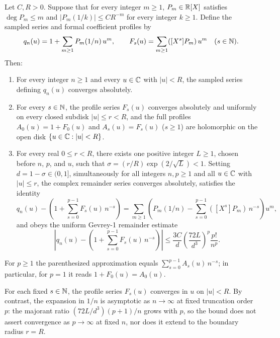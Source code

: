 \begin{theorem}
\label{thm:reciprocal-full-gevrey-expansion}
Let $C, R > 0$. Suppose that for every integer $m \ge 1$, $P_m \in \mathbb{R}[X]$ satisfies $\deg P_m \le m$ and $|P_m(1/k)| \le C R^{-m}$ for every integer $k \ge 1$. Define the sampled series and formal coefficient profiles by
\[
  q_n(u) = 1 + \sum_{m \ge 1} P_m(1/n)\, u^m,
  \qquad
  F_s(u) = \sum_{m \ge 1} ([X^s]P_m)\, u^m
  \quad (s \in \mathbb{N}).
\]
Then:
\begin{enumerate}
  \item For every integer $n \ge 1$ and every $u \in \mathbb{C}$ with $|u| < R$, the sampled series defining $q_n(u)$ converges absolutely.
  \item For every $s \in \mathbb{N}$, the profile series $F_s(u)$ converges absolutely and uniformly on every closed subdisk $|u| \le r < R$, and the full profiles $A_0(u) = 1 + F_0(u)$ and $A_s(u) = F_s(u)$ ($s \ge 1$) are holomorphic on the open disk $\{u \in \mathbb{C} : |u| < R\}$.
  \item For every real $0 \le r < R$, there exists one positive integer $L \ge 1$, chosen before $n$, $p$, and $u$, such that $\sigma = (r/R)\exp(2/\sqrt{L}) < 1$. Setting $d = 1 - \sigma \in (0, 1]$, simultaneously for all integers $n, p \ge 1$ and all $u \in \mathbb{C}$ with $|u| \le r$, the complex remainder series converges absolutely, satisfies the identity
  \[
    q_n(u) - \left(1 + \sum_{s=0}^{p-1} F_s(u)\,n^{-s}\right)
    = \sum_{m \ge 1} \left(P_m(1/n) - \sum_{s=0}^{p-1} ([X^s]P_m)\,n^{-s}\right) u^m,
  \]
  and obeys the uniform Gevrey-1 remainder estimate
  \[
    \left|q_n(u) - \left(1 + \sum_{s=0}^{p-1} F_s(u)\,n^{-s}\right)\right|
    \le \frac{3C}{d}\left(\frac{72L}{d^3}\right)^p \frac{p!}{n^p}.
  \]
\end{enumerate}
For $p \ge 1$ the parenthesized approximation equals $\sum_{s=0}^{p-1} A_s(u)\,n^{-s}$; in particular, for $p = 1$ it reads $1 + F_0(u) = A_0(u)$.
\leanok
{}
\end{theorem}

For each fixed $s \in \mathbb{N}$, the profile series $F_s(u)$ converges in $u$ on $|u| < R$. By contrast, the expansion in $1/n$ is asymptotic as $n \to \infty$ at fixed truncation order $p$: the majorant ratio $(72L/d^3)(p+1)/n$ grows with $p$, so the bound does not assert convergence as $p \to \infty$ at fixed $n$, nor does it extend to the boundary radius $r = R$.

